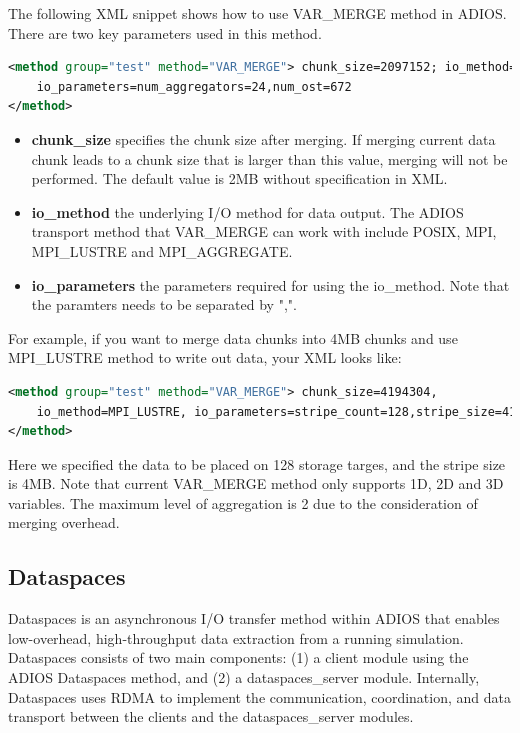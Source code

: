 The following XML snippet shows how to use VAR\_MERGE method in ADIOS.
There are two key parameters used in this method.

\begin{lstlisting}[language=XML]
<method group="test" method="VAR_MERGE"> chunk_size=2097152; io_method=MPI_AGGREGATE; 
    io_parameters=num_aggregators=24,num_ost=672
</method>
\end{lstlisting}

\begin{itemize}
\item \textbf{chunk\_size} specifies the chunk size after merging. If
merging current data chunk leads to a chunk size that is larger than this
value, merging will not be performed. The default value is 2MB without  
specification in XML.  

\item \textbf{io\_method} the underlying I/O method for data output.  
The ADIOS transport method that VAR\_MERGE can work with include POSIX, MPI,
    MPI\_LUSTRE and MPI\_AGGREGATE. 

\item \textbf{io\_parameters} the parameters required for using the
io\_method. Note that the paramters needs to be separated by ",".  
\end{itemize}

For example, if you want to merge data chunks into 4MB chunks and use
MPI\_LUSTRE method to write out data, your XML looks like:  

\begin{lstlisting}[language=XML]
<method group="test" method="VAR_MERGE"> chunk_size=4194304,
    io_method=MPI_LUSTRE, io_parameters=stripe_count=128,stripe_size=4194304
</method>
\end{lstlisting}

Here we specified the data to be placed on 128 storage targes, and the stripe
size is 4MB.
Note that current VAR\_MERGE method only supports 1D, 2D and 3D variables.
The maximum level of aggregation is 2 due to the consideration of
merging overhead.  

\subsection{Dataspaces}
\label{section-method-dataspaces}

Dataspaces is an asynchronous I/O transfer method within ADIOS that enables low-overhead, 
high-throughput data extraction from a running simulation. Dataspaces consists of two 
main components: (1) a client module using the ADIOS Dataspaces method, and (2)
a dataspaces\_server module. Internally, 
Dataspaces uses RDMA to implement the communication, coordination, and data transport 
between the clients and the dataspaces\_server modules.

